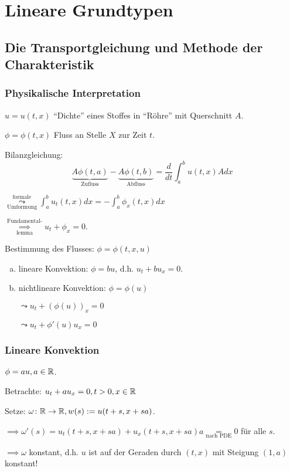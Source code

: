 \chapter*{Lineare Grundtypen}
\section{Die Transportgleichung und Methode der Charakteristik}

\subsection{Physikalische Interpretation}

$u = u(t,x)$ ``Dichte'' eines Stoffes in ``Röhre'' mit Querschnitt $A$.

$\phi = \phi(t,x)$ Fluss an Stelle $X$ zur Zeit $t$.

Bilanzgleichung:
$$
\underbrace{A \phi(t,a)}_{\text{Zufluss}} - \underbrace{A\phi(t,b)}_{\text{Abfluss}} = \frac{d}{dt} \int_a^b u(t,x) A dx
$$

$\overset{\text{formale}}{\underset{\text{Umformung}}{\leadsto}} \int_a^b u_t(t,x) dx = -\int_a^b \phi_x(t,x) dx$

$\overset{\text{Fundamental-}}{\underset{\text{lemma}}{\implies}} u_t + \phi_x = 0$.

Bestimmung des Flusses: $\phi = \phi(t,x,u)$

\begin{enumerate}[a)]
  \item lineare Konvektion: $\phi = bu$, d.h. $u_t + bu_x = 0$.
  \item nichtlineare Konvektion: $\phi = \phi(u)$

    $\leadsto u_t + (\phi(u))_x = 0$

    $\leadsto u_t + \phi'(u)u_x = 0$
\end{enumerate}

\subsection{Lineare Konvektion}

$\phi = au, a \in \mathbb{R}$.

Betrachte: $u_t + au_x = 0, t > 0, x \in \mathbb{R}$

Setze: $\omega \colon \mathbb{R} \to \mathbb{R}, w(s) := u(t + s, x + sa)$.

$\implies \omega'(s) = u_t(t+s, x + sa) + u_x(t+s, x+sa)a \underset{\text{nach PDE}}{=} 0$ für alle $s$.

$\implies \omega$ konstant, d.h. $u$ ist auf der Geraden durch $(t,x)$ mit Steigung $(1,a)$ konstant!

